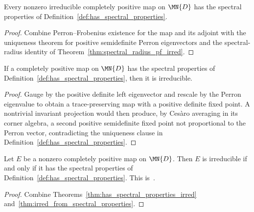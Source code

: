\begin{theorem}
    \label{thm:has_spectral_properties_irred}
    \leanok
    Every nonzero irreducible completely positive map on $\MN{D}$ has the
    spectral properties of Definition~\ref{def:has_spectral_properties}.
\end{theorem}

\begin{proof}
    \leanok
    Combine Perron--Frobenius existence for the map and its adjoint with the
    uniqueness theorem for positive semidefinite Perron eigenvectors and the
    spectral-radius identity of
    Theorem~\ref{thm:spectral_radius_pf_irred}.
\end{proof}

\begin{theorem}
    \label{thm:irred_from_spectral_properties}
    \leanok
    If a completely positive map on $\MN{D}$ has the spectral properties of
    Definition~\ref{def:has_spectral_properties}, then it is irreducible.
\end{theorem}

\begin{proof}
    \leanok
    Gauge by the positive definite left eigenvector and rescale by the Perron
    eigenvalue to obtain a trace-preserving map with a positive definite fixed
    point.
    A nontrivial invariant projection would then produce, by Ces\`aro averaging in
    its corner algebra, a second positive semidefinite fixed point not proportional
    to the Perron vector, contradicting the uniqueness clause in
    Definition~\ref{def:has_spectral_properties}.
\end{proof}

\begin{theorem}
    \label{thm:irred_iff_spectral_properties}
    \leanok
    Let $E$ be a nonzero completely positive map on $\MN{D}$.
    Then $E$ is irreducible if and only if it has the spectral properties of
    Definition~\ref{def:has_spectral_properties}.
    This is~\cite[Theorem~6.4]{Wolf2012Quantum}.
\end{theorem}

\begin{proof}
    \leanok
    Combine Theorems~\ref{thm:has_spectral_properties_irred}
    and~\ref{thm:irred_from_spectral_properties}.
\end{proof}
